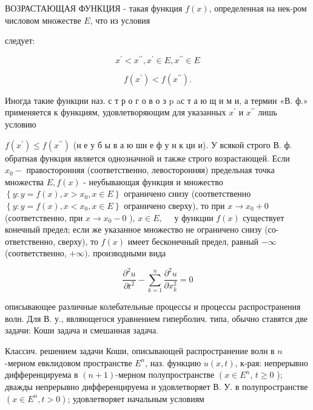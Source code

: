 \documentclass[10pt]{article}
\begin{document}
ВОЗРАСТАЮЩАЯ ФУНКЦИЯ - такая функция $f(x)$, определенная на нек-ром числовом множестве $E$, что из условия



следует:



\[

x^{\prime}<x^{\prime \prime}, x^{\prime} \in E, x^{\prime \prime} \in E

\]



\[

f\left(x^{\prime}\right)<f\left(x^{\prime \prime}\right) .

\]



Иногда такие функции наз. с т р о г о в о з p aс т а ю щ и м и, а термин «В. ф.» применяется к функциям, удовлетворяющим для указанных $x^{\prime}$ и $x^{\prime \prime}$ лишь условию



$f\left(x^{\prime}\right) \leqslant f\left(x^{\prime \prime}\right)$ (н е у б ы в а ю ши е ф у н к ци и). У всякой строго В. ф. обратная функция является однозначной и также строго возрастающей. Если $x_{0}-$ правосторонняя (соответственно, левосторонняя) предельная точка множества $E, f(x)$ - неубывающая функция и множество $\left\{y: y=f(x), x>x_{0}, x \in E\right\}$ ограничено снизу (соответственно $\left\{y: y=f(x), x<x_{0}, x \in E\right\}$ ограничено сверху), то при $x \rightarrow x_{0}+0$ (соответственно, при $x \rightarrow x_{0}-0$ ), $x \in E, \quad$ у функции $f(x)$ существует конечный предел; если же указанное множество не ограничено снизу (со- ответственно, сверху), то $f(x)$ имеет бесконечный предел, равный $-\infty$ (соответственно, $+\infty)$. производными вида



\[

\frac{\partial^{2} u}{\partial t^{2}}-\sum_{k=1}^{n} \frac{\partial^{2} u}{\partial x_{k}^{2}}=0

\]



описывающее различные колебательные процессы и процессы распространения волн. Для В. у., являющегося уравнением гиперболич. типа, обычно ставятся две задачи: Коши задача и смешанная задача.



Классич. решением задачи Коши, описывающей распространение волн в $n$-мерном евклидовом пространстве $E^{n}$, наз. функцию $u(x, t)$, к-рая: непрерывно дифференцируема в $(n+1)$-мерном полупространстве $\left(x \in E^{n}\right.$, $t \geqslant 0$ ); дважды непрерывно дифференцируема и удовлетворяет В. У. в полупространстве $\left(x \in E^{n}, t>0\right)$; удовлетворяет начальным условиям
\end{document}
